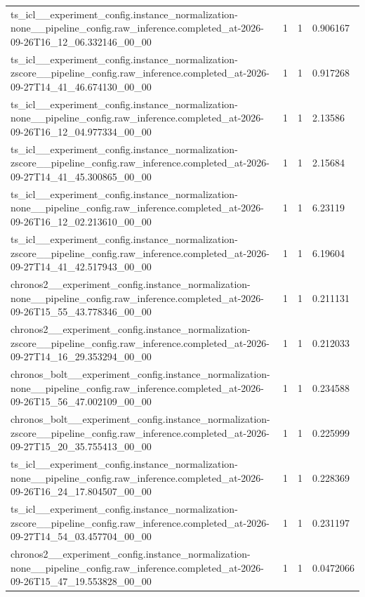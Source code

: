 \begin{tabular}{llll}
ts\_icl\_\_experiment\_config.instance\_normalization-none\_\_pipeline\_config.raw\_inference.completed\_at-2026-09-26T16\_12\_06.332146\_00\_00 & 1 & 1 & 0.906167 \\
ts\_icl\_\_experiment\_config.instance\_normalization-zscore\_\_pipeline\_config.raw\_inference.completed\_at-2026-09-27T14\_41\_46.674130\_00\_00 & 1 & 1 & 0.917268 \\
ts\_icl\_\_experiment\_config.instance\_normalization-none\_\_pipeline\_config.raw\_inference.completed\_at-2026-09-26T16\_12\_04.977334\_00\_00 & 1 & 1 & 2.13586 \\
ts\_icl\_\_experiment\_config.instance\_normalization-zscore\_\_pipeline\_config.raw\_inference.completed\_at-2026-09-27T14\_41\_45.300865\_00\_00 & 1 & 1 & 2.15684 \\
ts\_icl\_\_experiment\_config.instance\_normalization-none\_\_pipeline\_config.raw\_inference.completed\_at-2026-09-26T16\_12\_02.213610\_00\_00 & 1 & 1 & 6.23119 \\
ts\_icl\_\_experiment\_config.instance\_normalization-zscore\_\_pipeline\_config.raw\_inference.completed\_at-2026-09-27T14\_41\_42.517943\_00\_00 & 1 & 1 & 6.19604 \\
chronos2\_\_experiment\_config.instance\_normalization-none\_\_pipeline\_config.raw\_inference.completed\_at-2026-09-26T15\_55\_43.778346\_00\_00 & 1 & 1 & 0.211131 \\
chronos2\_\_experiment\_config.instance\_normalization-zscore\_\_pipeline\_config.raw\_inference.completed\_at-2026-09-27T14\_16\_29.353294\_00\_00 & 1 & 1 & 0.212033 \\
chronos\_bolt\_\_experiment\_config.instance\_normalization-none\_\_pipeline\_config.raw\_inference.completed\_at-2026-09-26T15\_56\_47.002109\_00\_00 & 1 & 1 & 0.234588 \\
chronos\_bolt\_\_experiment\_config.instance\_normalization-zscore\_\_pipeline\_config.raw\_inference.completed\_at-2026-09-27T15\_20\_35.755413\_00\_00 & 1 & 1 & 0.225999 \\
ts\_icl\_\_experiment\_config.instance\_normalization-none\_\_pipeline\_config.raw\_inference.completed\_at-2026-09-26T16\_24\_17.804507\_00\_00 & 1 & 1 & 0.228369 \\
ts\_icl\_\_experiment\_config.instance\_normalization-zscore\_\_pipeline\_config.raw\_inference.completed\_at-2026-09-27T14\_54\_03.457704\_00\_00 & 1 & 1 & 0.231197 \\
chronos2\_\_experiment\_config.instance\_normalization-none\_\_pipeline\_config.raw\_inference.completed\_at-2026-09-26T15\_47\_19.553828\_00\_00 & 1 & 1 & 0.0472066 \\

\end{tabular}
